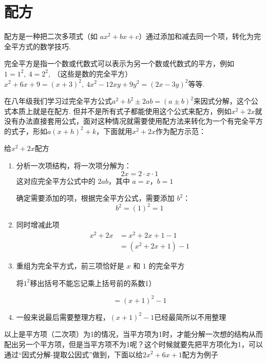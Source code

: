 \documentclass[lang=cn, 10pt, titlestyle=display, oneside, toc=twocol]{elegantbook}
\begin{document}
\section{配方}



配方是一种把二次多项式（如 \(ax^2 + bx + c\)）通过添加和减去同一个项，转化为完全平方式的数学技巧.
\par
\begin{remark}
    完全平方是指一个数或代数式可以表示为另一个数或代数式的平方，例如\( 1=1^2,\ 4=2^2,\ \)（这些是数的完全平方）\(x^2+6x+9=(x+3)^2,\ 4x^2-12xy+9y^2=(2x-3y)^2\)等等.
\end{remark}
\par
在八年级我们学习过完全平方公式\(a^2+b^2\pm2ab=(a\pm b)^2\)来因式分解，这个公式本质上就是在配方. 但并不是所有式子都能使用这个公式来配方，例如\(x^2+2x\)就没有办法直接套用公式，面对这种情况就需要使用配方法来转化为一个有完全平方的式子，形如\(a(x+h)^2+k\)，下面就用\(x^2+2x\)作为配方示范：
\begin{example}
给\(x^2+2x\)配方
\end{example}
\par
\begin{solution}
    \begin{enumerate}
  \item 分析一次项结构，将一次项分解为：\\
  \[
  2x = 2 \cdot x \cdot 1
  \]
  这对应完全平方公式中的 \(2ab\)，其中 \(a = x\)，\(b = 1\)
  
  确定需要添加的项，根据完全平方公式，需要添加 \(b^2\)：
  \[
  b^2 = (1)^2 = 1
  \]
  
  \item 同时增减此项
  \begin{align*}
  x^2 + 2x &= x^2 + 2x + 1 - 1 \\
            &= (x^2 + 2x + 1) - 1
  \end{align*}
  
  \item 重组为完全平方式，前三项恰好是 \(x\) 和 \(1\) 的完全平方
  \begin{remark}
  将$1^2$移出括号不能忘记乘上括号前的系数1）
  \end{remark}
  \[
  = (x + 1)^2-1
  \]
  \item 一般来说最后需要整理方程，$(x + 1)^2-1$已经最简所以不用整理
\end{enumerate}

\end{solution}
以上是平方项（二次项）为1的情况，当平方项为1时，才能分解一次想的结构从而配出另一个平方项，但是当平方项不为1呢？这个时候就要先把平方项化为1，可以通过“因式分解-提取公因式”做到，下面以给\(2x^2 + 6x+1\)配方为例子
\end{document}
